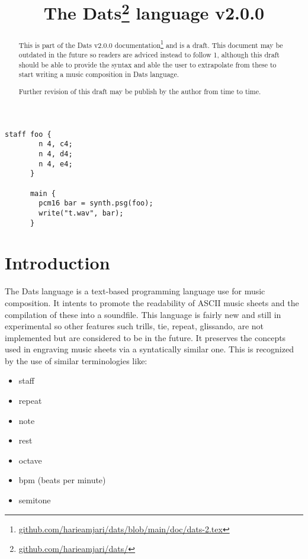 \documentclass[11pt]{article}
\title{\textbf{The Dats\thanks{\url{github.com/harieamjari/dats/}} language v2.0.0}}
\newcounter{numpar}
\newcommand{\np}[1][]{%
  \par
  \refstepcounter{numpar}%
  \noindent
  \makebox[0pt][r]{%
    \makebox[0pt][l]{{\footnotesize\thenumpar}}%
    \qquad
  }%
  #1%
  \ignorespaces
}
\let\stdsection\section
\renewcommand\section{\clearpage\setcounter{numpar}{0}\stdsection}
\begin{document}
\setcounter{tocdepth}{4}
\setcounter{secnumdepth}{4}
\maketitle

\begin{Verbatim}[frame=single, label=The "Hello World" of Dats]
      staff foo {
        n 4, c4;
        n 4, d4;
        n 4, e4;
      }

      main {
        pcm16 bar = synth.psg(foo);
        write("t.wav", bar);
      }
\end{Verbatim}
\vspace{1in}

\begin{abstract}
This is part of the Dats v2.0.0 documentation\footnote{\url{github.com/harieamjari/dats/blob/main/doc/dats-2.tex}} and is a draft. This document may be outdated in the future so readers are adviced instead to follow 1, although this draft should be able to provide the syntax and able the user to extrapolate from these to
start writing a music composition in Dats language.

Further revision of this draft may be publish by the author from time to time.
\end{abstract}

\tableofcontents

\section{Introduction}
\np The Dats language is a text-based programming language use for music composition.  
It intents to promote the readability of ASCII music sheets and the compilation of these into
 a soundfile.
This language is fairly new and still in experimental so other features such trills, tie,
repeat, glissando, are not implemented but are considered to be in the future. It preserves the
concepts used in engraving music sheets via a syntatically similar one. This is
recognized by the use of similar terminologies like:

\begin{multicols}{2}
\begin{itemize}
\renewcommand{\labelitemi}{--}
\item staff
\item repeat
\item note
\item rest
\item octave
\item bpm (beats per minute)
\item semitone
\end{itemize}
\end{multicols}
\end{document}
